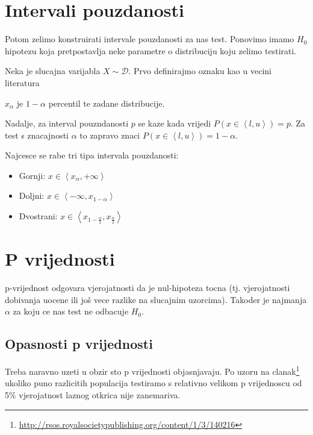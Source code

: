 \section{Intervali pouzdanosti}
Potom zelimo konstruirati intervale pouzdanosti za nas test. \cite{vis3} Ponovimo imamo $H_0$ hipotezu koja pretpostavlja neke parametre o distribuciju koju zelimo testirati. 

Neka je slucajna varijabla $X \sim \mathcal{D}$. 
Prvo definirajmo oznaku kao u vecini literatura \cite{vis3} \cite{engstat} 

$x_\alpha$ je $1-\alpha$ percentil te zadane distribucije.

Nadalje, za interval pouzndanosti $p$ se kaze kada vrijedi $P(x \in \left<l, u\right>) = p$. Za test s znacajnosti $\alpha$ to zapravo znaci  $P(x \in \left<l, u\right>) = 1-\alpha$.

Najcesce se rabe tri tipa intervala pouzdanosti:
\begin{itemize}
	\item Gornji: $x \in \left< x_\alpha, +\infty \right>$
	\item Doljni: $x \in \left<-\infty, x_{1-\alpha} \right>$
	\item Dvostrani: $x \in \left<x_{1-\frac{\alpha}{2}}, x_{\frac{\alpha}{2}} \right>$
\end{itemize}


\section{P vrijednosti}
p-vrijednost odgovara vjerojatnosti da je nul-hipoteza tocna (tj. vjerojatnosti dobivanja uocene ili još vece razlike na slucajnim uzorcima). Takoder je najmanja $\alpha$ za koju ce nas test ne odbacuje $H_0$.

\subsection{Opasnosti p vrijednosti}
Treba naravno uzeti u obzir sto p vrijednosti objasnjavaju. Po uzoru na clanak\footnote{\url{http://rsos.royalsocietypublishing.org/content/1/3/140216}} ukoliko puno razlicitih populacija testiramo s relativno velikom p vrijednoscu od 5\% vjerojatnost laznog otkrica nije zanemariva. 